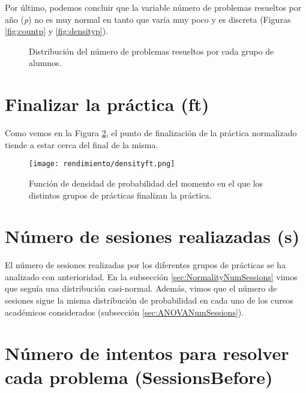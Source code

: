 Por último, podemos concluir que la variable número de problemas resueltos por año (\emph{p}) no es muy normal en tanto que varía muy poco y es discreta (Figuras \ref{fig:countp} y \ref{fig:densityp}).

\begin{figure}[H]
\centering
{}\qquad
{}
\caption{Distribución del número de problemas resueltos por cada grupo de alumnos.}
\label{fig:normalityp}
\end{figure}

\section{Finalizar la práctica (ft)}

Como vemos en la Figura \ref{fig:densityplotft}, el punto de finalización de la práctica normalizado tiende a estar cerca del final de la misma.

 \begin{figure}[H]
    \centering
    \texttt{[image: rendimiento/densityft.png]}
    \caption{Función de densidad de probabilidad del momento en el que los distintos grupos de prácticas finalizan la práctica.}
    \label{fig:densityplotft}
\end{figure}

\section{Número de sesiones realiazadas (s)}

El número de sesiones realizadas por los diferentes grupos de prácticas se ha analizado con anterioridad. En la subsección \ref{sec:NormalityNumSessions} vimos que seguía una distribución casi-normal. Además, vimos que el número de sesiones sigue la misma distribución de probabilidad en cada uno de los cursos académicos considerados (subsección \ref{sec:ANOVANumSessions}).

\section{Número de intentos para resolver cada problema (SessionsBefore)}

